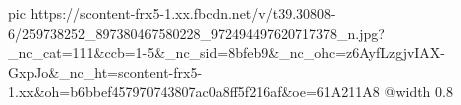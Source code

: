 
 
 
 
 

\ifcmt
  pic https://scontent-frx5-1.xx.fbcdn.net/v/t39.30808-6/259738252_897380467580228_972494497620717378_n.jpg?_nc_cat=111&ccb=1-5&_nc_sid=8bfeb9&_nc_ohc=z6AyfLzgjvIAX-GxpJo&_nc_ht=scontent-frx5-1.xx&oh=b6bbef457970743807ac0a8ff5f216af&oe=61A211A8
  @width 0.8
\fi
